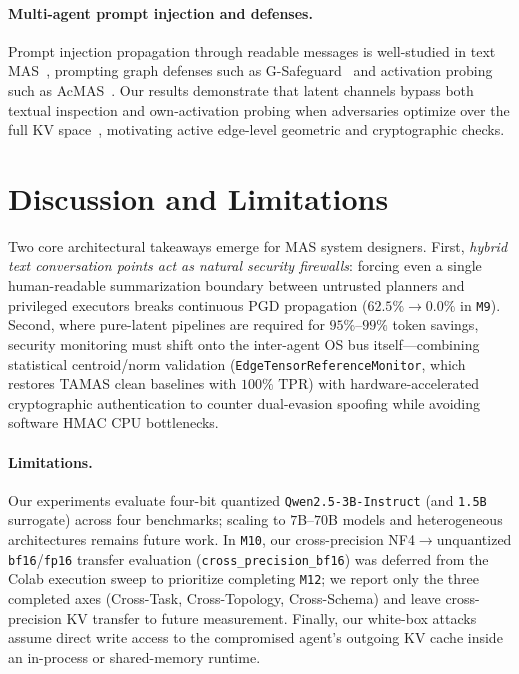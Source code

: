 \documentclass{article}
\begin{document}
\paragraph{Multi-agent prompt injection and defenses.}
Prompt injection propagation through readable messages is well-studied in
text MAS~\citep{greshake,infection}, prompting graph defenses such as
G-Safeguard~\citep{gsafeguard} and activation probing such as
AcMAS~\citep{acmas}. Our results demonstrate that latent channels bypass both
textual inspection and own-activation probing when adversaries optimize over the
full KV space~\citep{madry2018pgd,zou2023gcg}, motivating active edge-level
geometric and cryptographic checks.

\section{Discussion and Limitations}
\label{sec:discussion}
\label{sec:limits}
Two core architectural takeaways emerge for MAS system designers. First,
\emph{hybrid text conversation points act as natural security firewalls}: forcing
even a single human-readable summarization boundary between untrusted planners
and privileged executors breaks continuous PGD propagation ($62.5\% \to 0.0\%$
in \texttt{M9}). Second, where pure-latent pipelines are required for $95\%$--$99\%$
token savings, security monitoring must shift onto the inter-agent OS bus
itself---combining statistical centroid/norm validation (\texttt{EdgeTensorReferenceMonitor},
which restores TAMAS clean baselines with $100\%$ TPR) with hardware-accelerated
cryptographic authentication to counter dual-evasion spoofing while avoiding
software HMAC CPU bottlenecks.

\paragraph{Limitations.}
Our experiments evaluate four-bit quantized \texttt{Qwen2.5-3B-Instruct} (and
\texttt{1.5B} surrogate) across four benchmarks; scaling to $7$B--$70$B models
and heterogeneous architectures remains future work. In \texttt{M10}, our
cross-precision NF4$\to$unquantized \texttt{bf16}/\texttt{fp16} transfer evaluation
(\texttt{cross\_precision\_bf16}) was deferred from the Colab execution sweep
to prioritize completing \texttt{M12}; we report only the three completed axes
(Cross-Task, Cross-Topology, Cross-Schema) and leave cross-precision KV
transfer to future measurement. Finally, our white-box attacks assume direct
write access to the compromised agent's outgoing KV cache inside an
in-process or shared-memory runtime.
\end{document}

